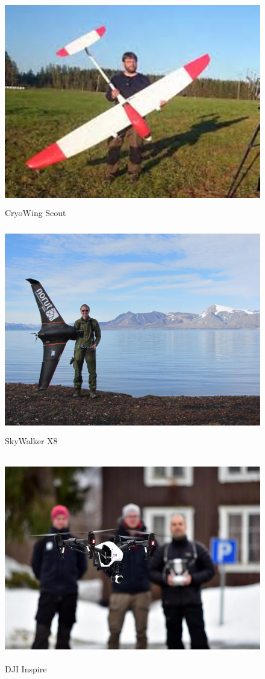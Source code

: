 \documentclass[12pt, a4paper]{article}
\begin{document}
\begin{figure}[h!]
	\centering
	\includegraphics[width=.6\textwidth, height=9cm]{bilder/CryoWing_Scout.jpeg}
	\caption{CryoWing Scout}
\end{figure}

\newpage

\begin{figure}[hpbt]
	\centering
	\includegraphics[width=.6\textwidth, height=9cm]{bilder/SkyWalker_X8.jpg}
	\caption{SkyWalker X8}
\end{figure}

\begin{figure}[h!]
	\centering
	\includegraphics[width = .6\textwidth, height = 9cm]{bilder/Dji_inspire.jpg}
	\caption{DJI Inspire}
\end{figure}
\end{document}

